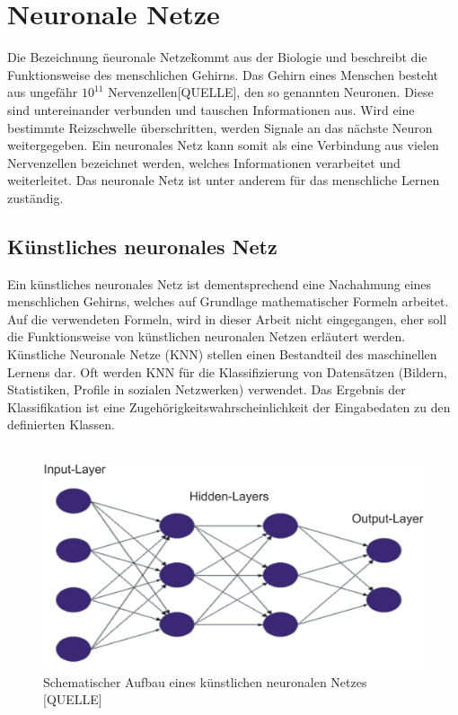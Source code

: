 \documentclass[a4paper,12pt,oneside]{article}
\begin{document}
  \section{Neuronale Netze}  
Die Bezeichnung \"neuronale Netze\" kommt aus der Biologie und beschreibt die Funktionsweise des menschlichen Gehirns. Das Gehirn eines Menschen besteht aus ungefähr $10^{11}$ Nervenzellen[QUELLE], den so genannten Neuronen. Diese sind untereinander verbunden und tauschen Informationen aus. Wird eine bestimmte Reizschwelle überschritten, werden Signale an das nächste Neuron weitergegeben. Ein neuronales Netz kann somit als eine Verbindung aus vielen Nervenzellen bezeichnet werden, welches Informationen verarbeitet und weiterleitet. Das neuronale Netz ist unter anderem für das menschliche Lernen zuständig. 
\\
\subsection{Künstliches neuronales Netz}
Ein künstliches neuronales Netz ist dementsprechend eine Nachahmung eines menschlichen Gehirns, welches auf Grundlage mathematischer Formeln arbeitet. Auf die verwendeten Formeln, wird in dieser Arbeit nicht eingegangen, eher soll die Funktionsweise von künstlichen neuronalen Netzen erläutert werden. Künstliche Neuronale Netze (KNN) stellen einen Bestandteil des maschinellen Lernens dar. Oft werden KNN für die Klassifizierung von Datensätzen (Bildern, Statistiken, Profile in sozialen Netzwerken) verwendet. Das Ergebnis der Klassifikation ist eine Zugehörigkeitswahrscheinlichkeit der Eingabedaten zu den definierten Klassen.
\\
\\
\begin{figure}
	[h]
	\centering
	\includegraphics[scale=0.5]{Sources/nnet.png}
		\caption{Schematischer Aufbau eines künstlichen neuronalen Netzes [QUELLE] }
	\label{img:KNN}
\end{figure}
\end{document}
